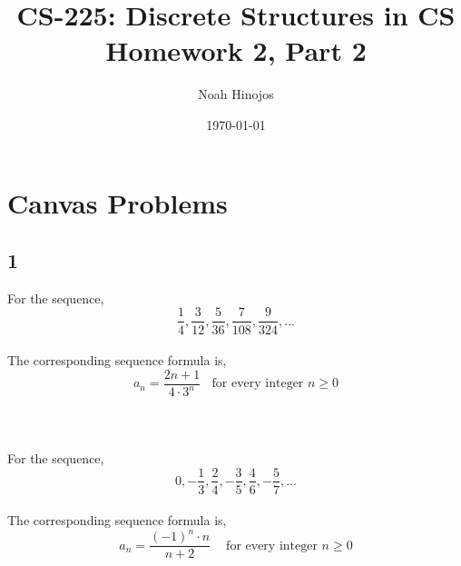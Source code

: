 \documentclass[12pt]{article}
\title{
  \textbf{CS-225: Discrete Structures in CS} \\
  Homework 2, Part 2
  }
\author{Noah Hinojos}
\date{\today}
\begin{document}
\maketitle

\section*{Canvas Problems}

\subsection*{1}

For the sequence, \\
$$\frac{1}{4}, \frac{3}{12}, \frac{5}{36}, \frac{7}{108}, \frac{9}{324},...$$
\\
The corresponding sequence formula is, \\
$$a_n = \frac{2n+1}{4\cdot3^n} \ \ \ \ \text{for every integer } n \geq 0$$
\\ \\ \\
For the sequence,
$$0, -\frac{1}{3}, \frac{2}{4}, -\frac{3}{5}, \frac{4}{6}, -\frac{5}{7},...$$
\\
The corresponding sequence formula is, \\
$$a_n = \frac{(-1)^n \cdot n}{n+2} \ \ \ \ \text{ for every integer } n \geq 0$$
\end{document}
